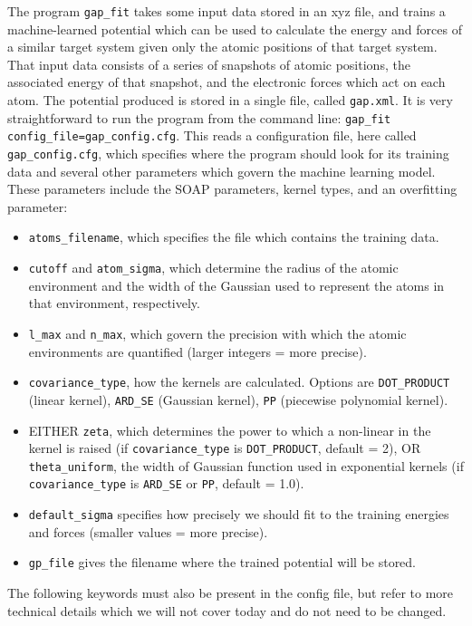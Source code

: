 \documentclass{article}
\begin{document}
The program \verb|gap_fit| takes some input data stored in an xyz file, and trains a machine-learned potential which can be used to calculate the energy and forces of a similar target system given only the atomic positions of that target system. That input data consists of a series of snapshots of atomic positions, the associated energy of that snapshot, and the electronic forces which act on each atom. The potential produced is stored in a single file, called \verb|gap.xml|. It is very straightforward to run the program from the command line: \verb|gap_fit config_file=gap_config.cfg|. This reads a configuration file, here called \verb|gap_config.cfg|, which specifies where the program should look for its training data and several other parameters which govern the machine learning model. These parameters include the SOAP parameters, kernel types, and an overfitting parameter:
\begin{itemize}

\item \verb|atoms_filename|, which specifies the file which contains the training data.
\item \verb|cutoff| and \verb|atom_sigma|, which determine the radius of the atomic environment and the width of the Gaussian used to represent the atoms in that environment, respectively.
\item \verb|l_max| and \verb|n_max|, which govern the precision with which the atomic environments are quantified (larger integers = more precise).
\item \verb|covariance_type|, how the kernels are calculated. Options are \verb|DOT_PRODUCT| (linear kernel), \verb|ARD_SE| (Gaussian kernel), \verb|PP| (piecewise polynomial kernel).
\item EITHER \verb|zeta|, which determines the power to which a non-linear in the kernel is raised (if \verb|covariance_type| is \verb|DOT_PRODUCT|, default = 2), OR \verb|theta_uniform|, the width of Gaussian function used in exponential kernels (if \verb|covariance_type| is \verb|ARD_SE| or \verb|PP|, default = 1.0).
\item \verb|default_sigma| specifies how precisely we should fit to the training energies and forces (smaller values = more precise).
\item \verb|gp_file| gives the filename where the trained potential will be stored.

\end{itemize}

The following keywords must also be present in the config file, but refer to more technical details which we will not cover today and do not need to be changed.
\end{document}
